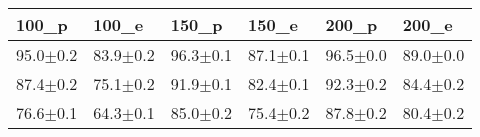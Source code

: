 \begin{tabular}{llllll}
\toprule
100_p & 100_e & 150_p & 150_e & 200_p & 200_e \\
\midrule
95.0$\pm$0.2 & 83.9$\pm$0.2 & 96.3$\pm$0.1 & 87.1$\pm$0.1 & 96.5$\pm$0.0 & 89.0$\pm$0.0 \\
87.4$\pm$0.2 & 75.1$\pm$0.2 & 91.9$\pm$0.1 & 82.4$\pm$0.1 & 92.3$\pm$0.2 & 84.4$\pm$0.2 \\
76.6$\pm$0.1 & 64.3$\pm$0.1 & 85.0$\pm$0.2 & 75.4$\pm$0.2 & 87.8$\pm$0.2 & 80.4$\pm$0.2 \\
\bottomrule
\end{tabular}
